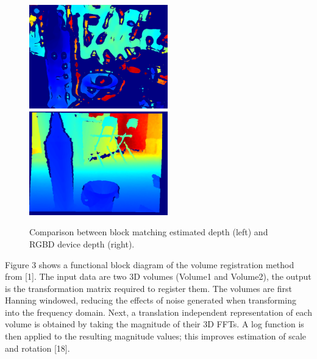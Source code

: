 \begin{figure}[!htb]
\centering
\includegraphics[width=6cm]{images/methodology/FVR/home_depth_frame_mono}
\includegraphics[width=6cm]{images/methodology/FVR/home_depth_frame}
\caption{Comparison between block matching estimated depth (left) and RGBD device depth (right).}
\label{fig:DepthGenerationExample}
\end{figure}
 


Figure 3 shows a functional block diagram of the volume registration method from [1]. The input data are two 3D volumes (Volume1 and Volume2), the output is the transformation matrix required to register them. The volumes are first Hanning windowed, reducing the effects of noise generated when transforming into the frequency domain. Next, a translation independent representation of each volume is obtained by taking the magnitude of their 3D FFTs. A log function is then applied to the resulting magnitude values; this improves estimation of scale and rotation [18]. \\

